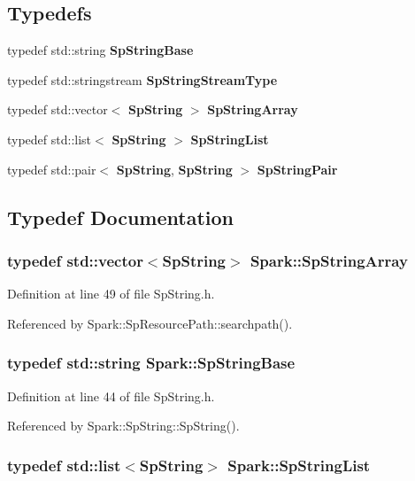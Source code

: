 \subsection*{Typedefs}
\begin{CompactItemize}
\item 
typedef std::string {\bf Sp\-String\-Base}
\item 
typedef std::stringstream {\bf Sp\-String\-Stream\-Type}
\item 
typedef std::vector$<$ {\bf Sp\-String} $>$ {\bf Sp\-String\-Array}
\item 
typedef std::list$<$ {\bf Sp\-String} $>$ {\bf Sp\-String\-List}
\item 
typedef std::pair$<$ {\bf Sp\-String}, {\bf Sp\-String} $>$ {\bf Sp\-String\-Pair}
\end{CompactItemize}


\subsection{Typedef Documentation}
\subsubsection{\setlength{\rightskip}{0pt plus 5cm}typedef std::vector$<${\bf Sp\-String}$>$ {\bf Spark::Sp\-String\-Array}}\label{namespaceSpark_a4}


Definition at line 49 of file Sp\-String.h.

Referenced by Spark::Sp\-Resource\-Path::searchpath().
\subsubsection{\setlength{\rightskip}{0pt plus 5cm}typedef std::string {\bf Spark::Sp\-String\-Base}}\label{namespaceSpark_a2}


Definition at line 44 of file Sp\-String.h.

Referenced by Spark::Sp\-String::Sp\-String().
\subsubsection{\setlength{\rightskip}{0pt plus 5cm}typedef std::list$<${\bf Sp\-String}$>$ {\bf Spark::Sp\-String\-List}}\label{namespaceSpark_a5}


